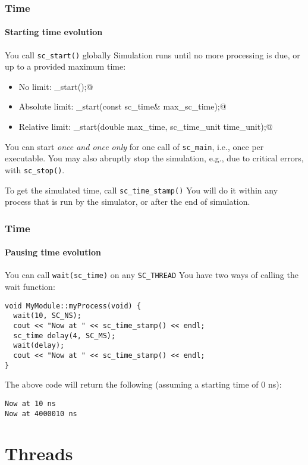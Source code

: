\begin{frame}[fragile]
\frametitle{Time}
\framesubtitle{Starting time evolution}

\begin{block}{You call \texttt{sc\_start()} globally}
\vspace{0.5em}
Simulation runs until no more processing is due, or up to a provided maximum time:
\begin{itemize}
\item No limit: {\small \verb@sc_start();@ }
\item Absolute limit: {\small \verb@sc_start(const sc_time& max_sc_time);@ }
\item Relative limit: {\small \verb@sc_start(double max_time, sc_time_unit time_unit);@ }
\end{itemize}
You can start {\em once and once only} for one call of \texttt{sc\_main}, i.e., once per executable. You may also abruptly 
stop the simulation, e.g., due to critical errors, with \texttt{sc\_stop()}.
\end{block}
\pause
\begin{block}{To get the simulated time, call \texttt{sc\_time\_stamp()}}
You will do it within any process that is run by the simulator, or after the end of simulation.
\end{block}
\end{frame}

\begin{frame}[fragile]
\frametitle{Time}
\framesubtitle{Pausing time evolution}

\begin{block}{You can call \texttt{wait(sc\_time)} on any \texttt{SC\_THREAD}}
\vspace{0.5em}
You have two ways of calling the wait function:
{\scriptsize 
\begin{verbatim}
void MyModule::myProcess(void) {
  wait(10, SC_NS);
  cout << "Now at " << sc_time_stamp() << endl;
  sc_time delay(4, SC_MS);
  wait(delay);
  cout << "Now at " << sc_time_stamp() << endl;
}
\end{verbatim}
}
\pause
The above code will return the following (assuming a starting time of 0 ns):
{\scriptsize 
\begin{verbatim}
Now at 10 ns
Now at 4000010 ns
\end{verbatim}
}
\end{block}
\end{frame}

\section{Threads}

